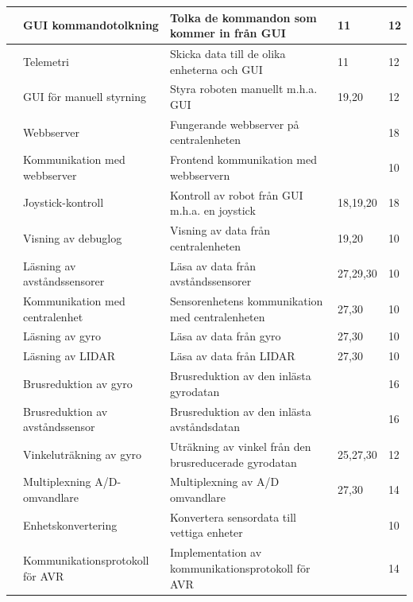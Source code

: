 \documentclass[a4paper,titlepage,12pt]{article}
\newcounter{aktNr}
\newcommand{\nextAktNr}{\stepcounter{aktNr}\arabic{aktNr}}
\begin{document}
\begin{longtable}[c]{ c p{4cm} p{6cm} p{2cm} p{2cm}}
		\nextAktNr{} & GUI kommandotolkning & Tolka de kommandon som kommer in från GUI & 11 & 12 \\ \midrule
		\nextAktNr{} & Telemetri & Skicka data till de olika enheterna och GUI & 11 & 12 \\ \midrule
		\nextAktNr{} & GUI för manuell styrning & Styra roboten manuellt m.h.a. GUI & 19,20 & 12 \\ \midrule
		\nextAktNr{} & Webbserver & Fungerande webbserver på centralenheten &  & 18 \\ \midrule
		\nextAktNr{} & Kommunikation med webbserver & Frontend kommunikation med webbservern &  & 10 \\ \midrule
		\nextAktNr{} & Joystick-kontroll & Kontroll av robot från GUI m.h.a. en joystick & 18,19,20 & 18 \\ \midrule
		\nextAktNr{} & Visning av debuglog & Visning av data från centralenheten & 19,20 & 10 \\ \midrule
		\nextAktNr{} & Läsning av avståndssensorer & Läsa av data från avståndssensorer & 27,29,30 & 10 \\ \midrule
		\nextAktNr{} & Kommunikation med centralenhet & Sensorenhetens kommunikation
                                                            med centralenheten& 27,30 & 10 \\ \midrule
		\nextAktNr{} & Läsning av gyro & Läsa av data från gyro & 27,30 & 10 \\ \midrule
		\nextAktNr{} & Läsning av LIDAR & Läsa av data från LIDAR & 27,30 & 10 \\ \midrule
		\nextAktNr{} & Brusreduktion av gyro & Brusreduktion av den inlästa gyrodatan &  & 16 \\ \midrule
		\nextAktNr{} & Brusreduktion av avståndssensor & Brusreduktion av den
                                                     inlästa avståndsdatan &  & 16 \\ \midrule
		\nextAktNr{} & Vinkeluträkning av gyro & Uträkning av vinkel från den
                                             brusreducerade gyrodatan & 25,27,30 & 12 \\ \midrule
		\nextAktNr{} & Multiplexning A/D-omvandlare & Multiplexning av A/D omvandlare & 27,30 & 14 \\ \midrule
		\nextAktNr{} & Enhetskonvertering & Konvertera sensordata till vettiga enheter &  & 10 \\ \midrule
		\nextAktNr{} & Kommunikationsprotokoll för AVR & Implementation av kommunikationsprotokoll för AVR  &  & 14 \\ \midrule

\end{longtable}
\end{document}
